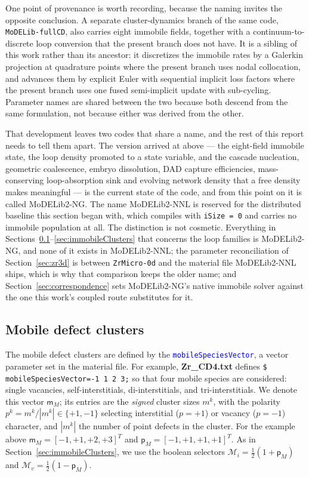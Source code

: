 \documentclass{article}
\newcommand{\textttclr}[1]{\textcolor{blue}{\texttt{#1}}}
\newcommand{\spvec}[1]{\bm{\mathsf{#1}}}   %
\newcommand{\MoD}{\textsf{MoDELib2-NNL}}
\newcommand{\ZrOd}{\texttt{ZrMicro-0d}}
\newcommand{\MoDNG}{\textsf{MoDELib2-NG}}
\begin{document}
One point of provenance is worth recording, because the naming invites the opposite
conclusion. A separate cluster-dynamics branch of the same code,
\texttt{MoDELib-fullCD}, also carries eight immobile fields, together with a
continuum-to-discrete loop conversion that the present branch does not have. It is
a sibling of this work rather than its ancestor: it discretizes the immobile rates
by a Galerkin projection at quadrature points where the present branch uses nodal
collocation, and advances them by explicit Euler with sequential implicit loss
factors where the present branch uses one fused semi-implicit update with
sub-cycling. Parameter names are shared between the two because both descend from
the same formulation, not because either was derived from the other.

That development leaves two codes that share a name, and the rest of this report
needs to tell them apart. The version arrived at above --- the eight-field immobile
state, the loop density promoted to a state variable, and the cascade nucleation,
geometric coalescence, embryo dissolution, DAD capture efficiencies,
mass-conserving loop-absorption sink and evolving network density that a free
density makes meaningful --- is the current state of the code, and from this point
on it is called {\MoDNG}. The name {\MoD} is reserved for the distributed baseline
this section began with, which compiles with \texttt{iSize = 0} and carries no
immobile population at all. The distinction is not cosmetic. Everything in
Sections~\ref{sec:mobileClusters}--\ref{sec:immobileClusters} that concerns the
loop families is {\MoDNG}, and none of it exists in {\MoD}; the parameter
reconciliation of Section~\ref{sec:zr3d} is between {\ZrOd} and the material file
{\MoD} ships, which is why that comparison keeps the older name; and
Section~\ref{sec:correspondence} sets {\MoDNG}'s native immobile solver against the
one this work's coupled route substitutes for it.


\subsection{Mobile defect clusters}
\label{sec:mobileClusters}
The mobile defect clusters are defined by the \textttclr{mobileSpeciesVector}, a vector parameter set in the material file. For example, \textbf{Zr\_CD4.txt} defines \texttt{\$ mobileSpeciesVector=-1 1 2 3;} so that four mobile species are considered: single vacancies, self-interstitials, di-interstitials, and tri-interstitials. We denote this vector $\spvec{m}_M$; its entries are the \emph{signed} cluster sizes $m^k$, with the polarity $p^k=m^k/|m^k|\in\{+1,-1\}$ selecting interstitial ($p=+1$) or vacancy ($p=-1$) character, and $|m^k|$ the number of point defects in the cluster. For the example above $\spvec{m}_M=[-1,+1,+2,+3]^T$ and $\spvec{p}_M=[-1,+1,+1,+1]^T$. As in Section~\ref{sec:immobileClusters}, we use the boolean selectors $\mathcal{M}_i=\tfrac12(1+\spvec{p}_M)$ and $\mathcal{M}_v=\tfrac12(1-\spvec{p}_M)$.
\end{document}
